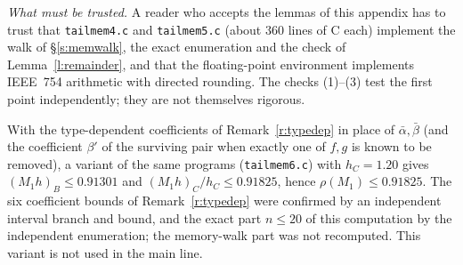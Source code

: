 \emph{What must be trusted.} A reader who accepts the lemmas of this appendix has to trust that \texttt{tailmem4.c} and \texttt{tailmem5.c} (about $360$ lines of C each) implement the walk of \S\ref{s:memwalk}, the exact enumeration and the check of Lemma~\ref{l:remainder}, and that the floating-point environment implements IEEE~754 arithmetic with directed rounding. The checks (1)--(3) test the first point independently; they are not themselves rigorous.

\begin{remark}\label{r:tailtypedep}
With the type-dependent coefficients of Remark~\ref{r:typedep} in place of $\bar\alpha, \bar\beta$ (and the coefficient $\beta'$ of the surviving pair when exactly one of $f, g$ is known to be removed), a variant of the same programs (\texttt{tailmem6.c}) with $h_C = 1.20$ gives $(M_1 h)_B \le 0.91301$ and $(M_1 h)_C / h_C \le 0.91825$, hence $\rho(M_1) \le 0.91825$. The six coefficient bounds of Remark~\ref{r:typedep} were confirmed by an independent interval branch and bound, and the exact part $n \le 20$ of this computation by the independent enumeration; the memory-walk part was not recomputed. This variant is not used in the main line.
\end{remark}
